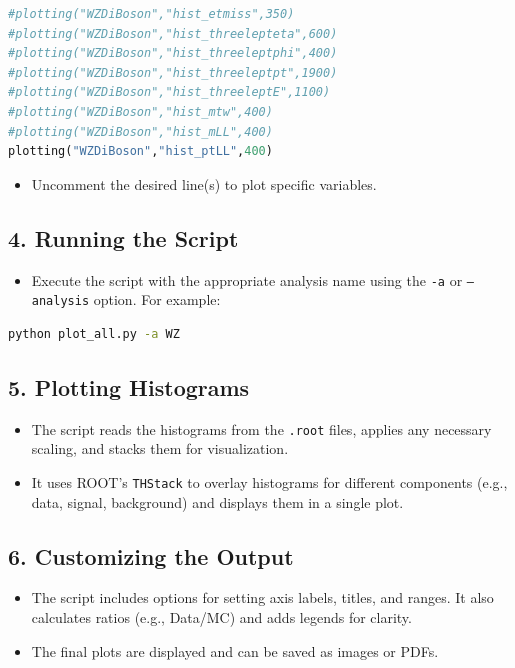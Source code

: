 \documentclass{article}
\begin{document}
\begin{lstlisting}[language=python]
#plotting("WZDiBoson","hist_etmiss",350)
#plotting("WZDiBoson","hist_threelepteta",600)
#plotting("WZDiBoson","hist_threeleptphi",400)
#plotting("WZDiBoson","hist_threeleptpt",1900)
#plotting("WZDiBoson","hist_threeleptE",1100)
#plotting("WZDiBoson","hist_mtw",400)
#plotting("WZDiBoson","hist_mLL",400)
plotting("WZDiBoson","hist_ptLL",400)
\end{lstlisting}

\begin{itemize}
    \item Uncomment the desired line(s) to plot specific variables.
\end{itemize}

\subsection*{4. Running the Script}
\begin{itemize}
    \item Execute the script with the appropriate analysis name using the \texttt{-a} or \texttt{--analysis} option. For example:
\end{itemize}

\begin{lstlisting}[language=bash]
python plot_all.py -a WZ
\end{lstlisting}

\subsection*{5. Plotting Histograms}
\begin{itemize}
    \item The script reads the histograms from the \texttt{.root} files, applies any necessary scaling, and stacks them for visualization.
    \item It uses ROOT's \texttt{THStack} to overlay histograms for different components (e.g., data, signal, background) and displays them in a single plot.
\end{itemize}

\subsection*{6. Customizing the Output}
\begin{itemize}
    \item The script includes options for setting axis labels, titles, and ranges. It also calculates ratios (e.g., Data/MC) and adds legends for clarity.
    \item The final plots are displayed and can be saved as images or PDFs.
\end{itemize}
\end{document}
